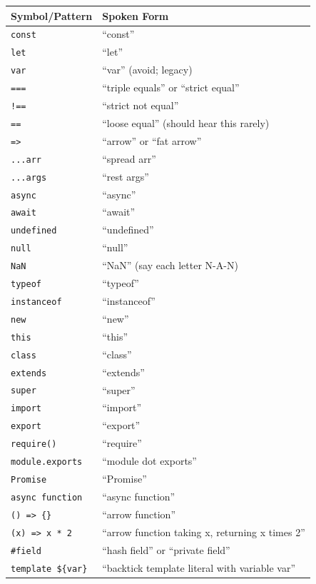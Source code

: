\documentclass[
  justified,
  openright,
]{tufte-book}
\begin{document}
{\def\LTcaptype{none} %
\begin{longtable}[]{@{}
  >{\raggedright\arraybackslash}p{}
  >{\raggedright\arraybackslash}p{}@{}}
\toprule\noalign{}
\begin{minipage}[b]{\linewidth}\raggedright
Symbol/Pattern
\end{minipage} & \begin{minipage}[b]{\linewidth}\raggedright
Spoken Form
\end{minipage} \\
\midrule\noalign{}
\endhead
\bottomrule\noalign{}
\endlastfoot
\texttt{const} & ``const'' \\
\texttt{let} & ``let'' \\
\texttt{var} & ``var'' (avoid; legacy) \\
\texttt{===} & ``triple equals'' or ``strict equal'' \\
\texttt{!==} & ``strict not equal'' \\
\texttt{==} & ``loose equal'' (should hear this rarely) \\
\texttt{=\textgreater{}} & ``arrow'' or ``fat arrow'' \\
\texttt{...arr} & ``spread arr'' \\
\texttt{...args} & ``rest args'' \\
\texttt{async} & ``async'' \\
\texttt{await} & ``await'' \\
\texttt{undefined} & ``undefined'' \\
\texttt{null} & ``null'' \\
\texttt{NaN} & ``NaN'' (say each letter N-A-N) \\
\texttt{typeof} & ``typeof'' \\
\texttt{instanceof} & ``instanceof'' \\
\texttt{new} & ``new'' \\
\texttt{this} & ``this'' \\
\texttt{class} & ``class'' \\
\texttt{extends} & ``extends'' \\
\texttt{super} & ``super'' \\
\texttt{import} & ``import'' \\
\texttt{export} & ``export'' \\
\texttt{require()} & ``require'' \\
\texttt{module.exports} & ``module dot exports'' \\
\texttt{Promise} & ``Promise'' \\
\texttt{async\ function} & ``async function'' \\
\texttt{()\ =\textgreater{}\ \{\}} & ``arrow function'' \\
\texttt{(x)\ =\textgreater{}\ x\ *\ 2} & ``arrow function taking x,
returning x times 2'' \\
\texttt{\#field} & ``hash field'' or ``private field'' \\
\texttt{\textasciigrave{}template\ \$\{var\}\textasciigrave{}} &
``backtick template literal with variable var'' \\
\end{longtable}
}
\end{document}
